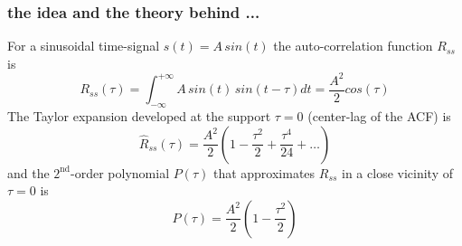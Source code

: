\documentclass[11pt,aspectratio=169]{beamer}
\begin{document}
	\begin{frame}
		\frametitle{\appendixname{} \textendash{} the idea and the theory behind ...}
		For a sinusoidal time-signal $s(t) = A\,sin(t)$ the auto-correlation function $R_{ss}$ is
		\begin{equation}
			R_{ss}(\tau) = \int_{-\infty}^{+\infty} A\,sin(t)\,sin(t-\tau) dt = \frac{A^2}{2} cos(\tau)
		\end{equation}
		The Taylor expansion developed at the support $\tau = 0$ (center-lag of the ACF) is
		\begin{equation}
			\hat{R}_{ss}(\tau) = \frac{A^2}{2} \left(1 - \frac{{{\tau}^{2}}}{2} + \frac{{{\tau}^{4}}}{24} + \ldots \right)
		\end{equation}
		and the $2^{\text{nd}}$-order polynomial $P(\tau)$ that approximates $R_{ss}$ in a close vicinity of $\tau = 0$ is
		\begin{equation}
			P(\tau) = \frac{A^2}{2} \left( 1 - \frac{{{\tau}^{2}}}{2} \right)
		\end{equation}
	\end{frame}
\end{document}
